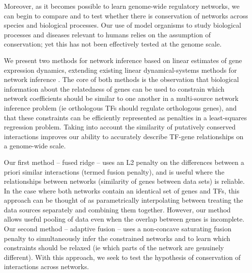 \documentclass[11pt]{article}
\begin{document}
Moreover, as it becomes possible to learn genome-wide regulatory networks, we can begin to compare and to test whether there is conservation of networks across species and biological processes. Our use of model organisms to study biological processes and diseases relevant to humans relies on the assumption of conservation; yet this has not been effectively tested at the genome scale. 

We present two methods for network inference based on linear estimates of gene expression dynamics, extending existing linear dynamical-systems methods for network inference \cite{bonneau_predictive_2007, arrieta-ortiz_experimentally_2015}. The core of both methods is the observation that biological information about the relatedness of genes can be used to constrain which network coefficients should be similar to one another in a multi-source network inference problem (ie orthologous TFs should regulate orthologous genes), and that these constraints can be efficiently represented as penalties in a least-squares regression problem. Taking into account the similarity of putatively conserved interactions improves our ability to accurately describe TF-gene relationships on a genome-wide scale.  

Our first method -- fused ridge -- uses an L2 penalty on the differences between a priori similar interactions (termed fusion penalty), and is useful where the relationships between networks (similarity of genes between data sets) is reliable. In the case where both networks contain an identical set of genes and TFs, this approach can be thought of as parametrically interpolating between treating the data sources separately and combining them together. However, our method allows useful pooling of data even when the overlap between genes is incomplete. Our second method -- adaptive fusion -- uses a non-concave saturating fusion penalty to simultaneously infer the constrained networks and to learn which constraints should be relaxed (ie which parts of the network are genuinely different). With this approach, we seek to test the hypothesis of conservation of interactions across networks.
\end{document}
